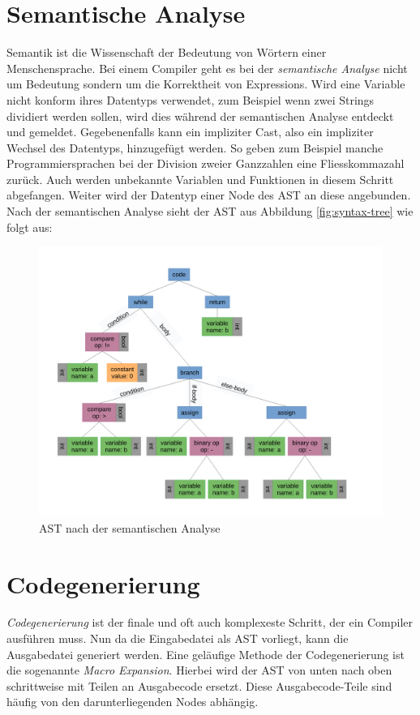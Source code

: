 \section{Semantische Analyse}
Semantik ist die Wissenschaft der Bedeutung von Wörtern einer Menschensprache. Bei einem Compiler geht es bei der \textit{semantische Analyse} nicht um Bedeutung sondern um die Korrektheit von Expressions.
Wird eine Variable nicht konform ihres Datentyps verwendet, zum Beispiel wenn zwei Strings dividiert werden sollen, wird dies während der semantischen Analyse entdeckt und gemeldet.
Gegebenenfalls kann ein impliziter Cast, also ein impliziter Wechsel des Datentyps, hinzugefügt werden.
So geben zum Beispiel manche Programmiersprachen bei der Division zweier Ganzzahlen eine Fliesskommazahl zurück.
Auch werden unbekannte Variablen und Funktionen in diesem Schritt abgefangen.
Weiter wird der Datentyp einer Node des AST an diese angebunden. Nach der semantischen Analyse sieht der AST aus Abbildung \ref{fig:syntax-tree} wie folgt aus:

\begin{figure}[H]
    \centering
    \includegraphics[scale=0.4]{resources/images/AST_with_types.pdf}
    \caption[AST nach der semantischen Analyse (Basierend auf Abbildung \ref{fig:syntax-tree})]{AST nach der semantischen Analyse}
    \label{fig:syntax-tree-with-types}
\end{figure}


\section{Codegenerierung} \label{sec:traditional_code_generation}
\textit{Codegenerierung} ist der finale und oft auch komplexeste Schritt, der ein Compiler ausführen muss.
Nun da die Eingabedatei als AST vorliegt, kann die Ausgabedatei generiert werden. Eine geläufige Methode der Codegenerierung ist die sogenannte \textit{Macro Expansion}.
Hierbei wird der AST von unten nach oben schrittweise mit Teilen an Ausgabecode ersetzt.
Diese Ausgabecode-Teile sind häufig von den darunterliegenden Nodes abhängig. 

